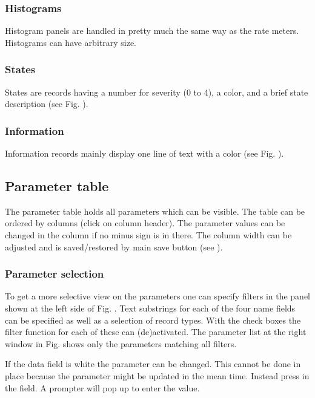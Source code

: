 {\subsubsection{Histograms}
Histogram panels are handled in pretty much the same way as the rate meters.
Histograms can have arbitrary size.
\subsubsection{States}
States are records having a number for severity (0 to 4), a color,
and a brief state description (see Fig. ).
\subsubsection{Information}
Information records mainly display one line of text with a color
(see Fig. ).
\subsection{Parameter table}
The parameter table holds all parameters which can be visible.
The table can be ordered by columns (click on column header). 
The parameter values can be changed
in the  column if no minus sign is in there.
The column width can be adjusted and is saved/restored by main save button
(see ).
\subsubsection{Parameter selection}
To get a more selective view on the parameters one can specify
filters in the panel shown at the left side of Fig. . 
Text substrings for each of the four name fields
can be specified as well as a selection of record types.
With the check boxes the filter function for each of these can (de)activated.
The parameter list at the right window in Fig. 
shows only the parameters matching all filters.

If the data field is white the parameter can be changed.
This cannot be done in place because the parameter might be
updated in the mean time. Instead press  in the field.
A prompter will pop up to enter the value.
}
